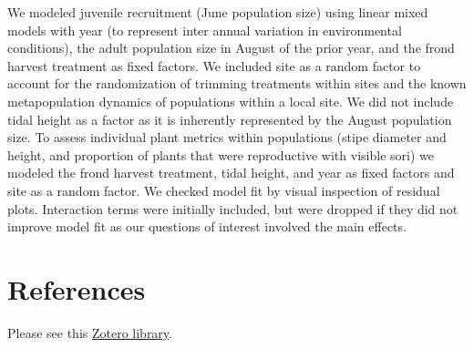 \documentclass[
]{article}
\begin{document}
We modeled juvenile recruitment (June population size) using linear mixed models with year (to represent inter annual variation in environmental conditions), the adult population size in August of the prior year, and the frond harvest treatment as fixed factors. We included site as a random factor to account for the randomization of trimming treatments within sites and the known metapopulation dynamics of populations within a local site. We did not include tidal height as a factor as it is inherently represented by the August population size. To assess individual plant metrics within populations (stipe diameter and height, and proportion of plants that were reproductive with visible sori) we modeled the frond harvest treatment, tidal height, and year as fixed factors and site as a random factor. We checked model fit by visual inspection of residual plots. Interaction terms were initially included, but were dropped if they did not improve model fit as our questions of interest involved the main effects.

\hypertarget{references}{%
\section{References}\label{references}}

Please see this \href{https://www.zotero.org/groups/4289135/postelsia_palmaeformis/library}{Zotero library}.
\end{document}
